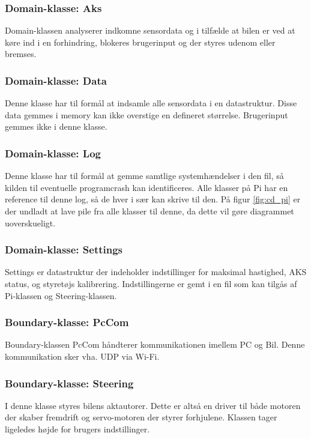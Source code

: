\subsubsection{Domain-klasse: Aks}
Domain-klassen analyserer indkomne sensordata og i tilfælde at bilen er ved at køre ind i en forhindring, blokeres brugerinput og der styres udenom eller bremses.

\subsubsection{Domain-klasse: Data}
Denne klasse har til formål at indsamle alle sensordata i en datastruktur. Disse data gemmes i memory kan ikke overstige en defineret størrelse. Brugerinput gemmes ikke i denne klasse.

\subsubsection{Domain-klasse: Log}
Denne klasse har til formål at gemme samtlige systemhændelser i den fil, så kilden til eventuelle programcrash kan identificeres. Alle klasser på Pi har en reference til denne log, så de hver i sær kan skrive til den. På figur \ref{fig:cd_pi} er der undladt at lave pile fra alle klasser til denne, da dette vil gøre diagrammet uoverskueligt. 

\subsubsection{Domain-klasse: Settings}
Settings er datastruktur der indeholder indstillinger for maksimal hastighed, AKS status, og styretøjs kalibrering. Indstillingerne er gemt i en fil som kan tilgås af Pi-klassen og Steering-klassen.

\subsubsection{Boundary-klasse: PcCom}
Boundary-klassen PcCom håndterer kommunikationen imellem PC og Bil. Denne kommunikation sker vha. UDP via Wi-Fi.

\subsubsection{Boundary-klasse: Steering}
I denne klasse styres bilens aktautorer. Dette er altså en driver til både motoren der skaber fremdrift og servo-motoren der styrer forhjulene. Klassen tager ligeledes højde for brugers indstillinger.

